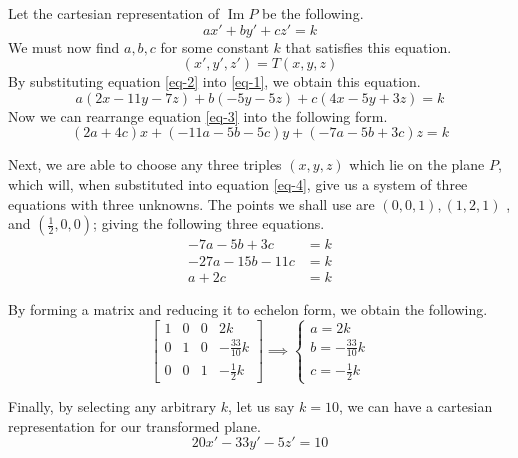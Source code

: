 \documentclass{article}
\newenvironment{answers}{ %
	\begin{enumerate}
		\setlength{\itemsep}{\bigskipamount}
}{\end{enumerate}}
\newcommand{\img}{\operatorname{Im}}
\begin{document}
\begin{answers}
\begin{enumerate}
				Let the cartesian representation of \(\img P\) be the following.
				\begin{equation}
					ax'+by'+cz'=k \label{eq-1}
				\end{equation}
				We must now find \(a, b, c\) for some constant \(k\) that satisfies this equation.
				\begin{equation}
					(x', y', z') = T(x,y,z) \label{eq-2}
				\end{equation}
				By substituting equation \ref{eq-2} into \ref{eq-1}, we obtain this equation.
				\begin{equation}
					a(2x - 11y - 7z)+b(-5y - 5z)+c(4x - 5y + 3z)=k \label{eq-3}
				\end{equation}
				Now we can rearrange equation \ref{eq-3} into the following form.
				\begin{equation}
					(2a+4c)x+(-11a-5b-5c)y+(-7a-5b+3c)z=k \label{eq-4}
				\end{equation}

				Next, we are able to choose any three triples \((x, y, z)\) which lie on the plane \(P\), which will, when substituted into equation \ref{eq-4}, give us a system of three equations with three unknowns. The points we shall use are \((0,0,1), (1,2,1)\) , and \((\frac{1}{2}, 0, 0)\); giving the following three equations.
				\begin{align*}
					-7a-5b+3c    & =k \\
					-27a-15b-11c & =k \\
					a+2c         & =k
				\end{align*}

				By forming a matrix and reducing it to echelon form, we obtain the following.
				\begin{equation*}
					\left[ \begin{matrix}
							1 & 0 & 0 & 2k              \\[6pt]
							0 & 1 & 0 & -\frac{33}{10}k \\[6pt]
							0 & 0 & 1 & -\frac{1}{2}k
						\end{matrix} \right]
					\implies
					\begin{cases}
						a= 2 k             \\
						b= -\frac{33}{10}k \\
						c= -\frac{1}{2}k
					\end{cases}
				\end{equation*}

				Finally, by selecting any arbitrary \(k\), let us say \(k=10\), we can have a cartesian representation for our transformed plane.
				\begin{equation*}
					20x'-33y'-5z'=10
				\end{equation*}


\end{enumerate}
\end{answers}
\end{document}
